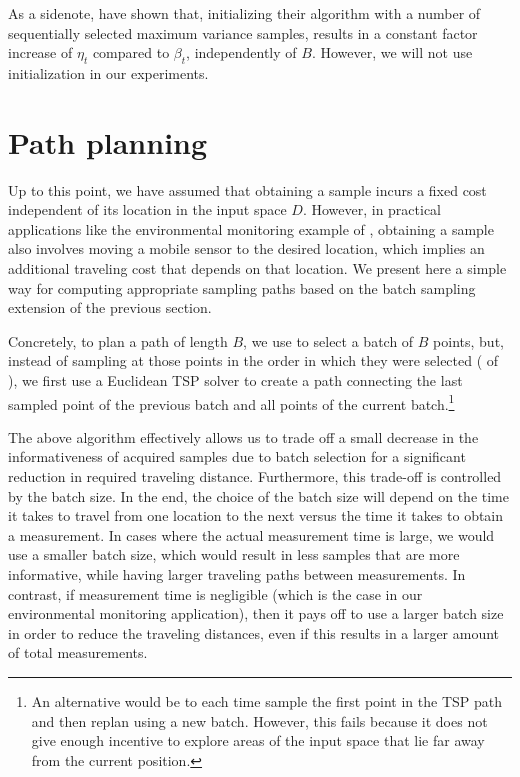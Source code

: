 As a sidenote, \citet{desautels12} have shown that,
initializing their \gpbucb algorithm with a number of sequentially selected
maximum variance samples, results in a constant factor increase of $\eta_t$
compared to $\beta_t$, independently of $B$.
However, we will not use initialization in our experiments.

\section{Path planning} \label{sect:pp}
Up to this point, we have assumed that obtaining a sample incurs a fixed
cost independent of its location in the input space $D$. However, in practical
applications like the environmental monitoring example of ,
obtaining a sample also involves moving a mobile sensor to the desired
location, which implies an additional traveling cost that depends on
that location. We present here a simple way for
computing appropriate sampling paths based on the batch sampling
extension of the previous section.

Concretely, to plan a path of length $B$, we use \bacl to select a batch of
$B$ points, but, instead of sampling at those points in the order in which
they were selected
( of ), we first use a
Euclidean TSP solver to create a path connecting the last sampled point of
the previous batch and all points of the current
batch.\footnote{An alternative would be to each time sample the first
point in the TSP path and then replan using a new batch. However, this fails
because it does not give enough incentive to explore areas of the input space
that lie far away from the current position.}

The above algorithm effectively allows us to trade off a small decrease in
the informativeness of acquired samples due to batch selection for a
significant reduction in required traveling distance. Furthermore, this
trade-off is controlled by the batch size. In the end, the choice of the
batch size will depend on the time it takes to travel from one location
to the next versus the time it takes to obtain a measurement. In cases
where the actual measurement time is large, we would use a smaller
batch size, which would result in less samples that are more informative,
while having larger traveling paths between measurements.
In contrast, if measurement time is negligible (which is the case in our
environmental monitoring application), then it pays off to use a larger
batch size in order to reduce the traveling distances, even if this
results in a larger amount of total measurements.

